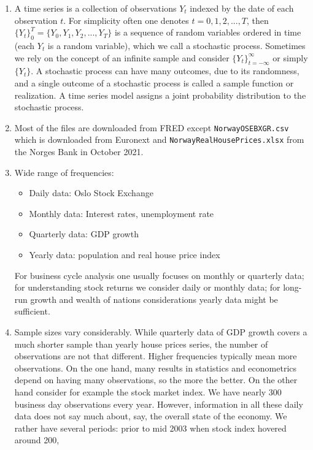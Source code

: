 \begin{enumerate}
\item A time series is a collection of observations $Y_t$ indexed by the date of each observation $t$.
For simplicity often one denotes $t=0,1,2,...,T$,
  then $\{Y_t\}_0^T = \{Y_0,Y_1,Y_2,...,Y_T\}$ is a sequence of random variables ordered in time
  (each $Y_t$ is a random variable), which we call a stochastic process.
Sometimes we rely on the concept of an infinite sample and consider $\{Y_t\}_{t=-\infty}^\infty$ or simply $\{Y_t\}$.
A stochastic process can have many outcomes, due to its randomness,
  and a single outcome of a stochastic process is called a sample function or realization.
A time series model assigns a joint probability distribution to the stochastic process.
\item Most of the files are downloaded from FRED except \texttt{NorwayOSEBXGR.csv} which is downloaded from Euronext and \texttt{NorwayRealHousePrices.xlsx} from the Norges Bank in October 2021.

\item Wide range of frequencies:
\begin{itemize}
    \item Daily data: Oslo Stock Exchange
    \item Monthly data: Interest rates, unemployment rate
    \item Quarterly data: GDP growth
    \item Yearly data: population and real house price index
\end{itemize}
For business cycle analysis one usually focuses on monthly or quarterly data;
  for understanding stock returns we consider daily or monthly data;
  for long-run growth and wealth of nations considerations yearly data might be sufficient.
\item Sample sizes vary considerably. While quarterly data of GDP growth covers a much shorter sample than yearly house prices series,
  the number of observations are not that different.
Higher frequencies typically mean more observations.
On the one hand, many results in statistics and econometrics depend on having many observations, so the more the better.
On the other hand consider for example the stock market index.
We have nearly 300 business day observations every year.
However, information in all these daily data does not say much about, say, the overall state of the economy.
We rather have several periods:
  prior to mid 2003 when stock index hovered around 200,

\end{enumerate}
